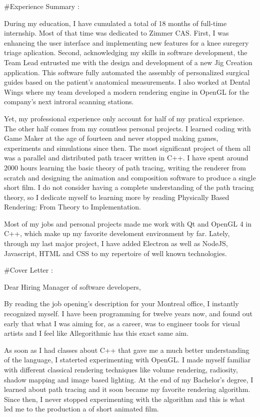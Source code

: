 #Experience Summary :

During my education, I have cumulated a total of 18 months of full-time internship. Most of that time was dedicated to Zimmer CAS. First, I was enhancing the user interface and implementing new features for a knee suregery triage aplication. Second, acknowledging my skills in software development, the Team Lead entrusted me with the design and development of a new Jig Creation application. This software fully automated the assembly of personalized surgical guides based on the patient's anatomical measurements. I also worked at Dental Wings where my team developed a modern rendering engine in OpenGL for the company's next introral scanning stations.

Yet, my professional experience only account for half of my pratical exprience. The other half comes from my countless personal projects. I learned coding with Game Maker at the age of fourteen and never stopped making games, experiments and simulations since then. The most significant project of them all was a parallel and distributed path tracer written in C++. I have spent around 2000 hours learning the basic theory of path tracing, writing the renderer from scratch and designing the animation and composition software to produce a single short film. I do not consider having a complete understanding of the path tracing theory, so I dedicate myself to learning more by reading Physically Based Rendering: From Theory to Implementation.

Most of my jobs and personal projects made me work with Qt and OpenGL 4 in C++, which make up my favorite develoment environment by far. Lately, through my last major project, I have added Electron as well as NodeJS, Javascript, HTML and CSS to my repertoire of well known technologies.


#Cover Letter :

Dear Hiring Manager of software developers,

By reading the job opening's description for your Montreal office, I instantly recognized myself. I have been programming for twelve years now, and found out early that what I was aiming for, as a career, was to engineer tools for visual artists and I feel like Allegorithmic has this exact same aim.

As soon as I had classes about C++ that gave me a much better understanding of the language, I staterted experimenting with OpenGL. I made myself familiar with different classical rendering techniques like volume rendering, radiosity, shadow mapping and image based lighting. At the end of my Bachelor's degree, I learned about path tracing and it soon became my favorite rendering algorithm. Since then, I never stopped experimenting with the algorithm and this is what led me to the production a of short animated film.


